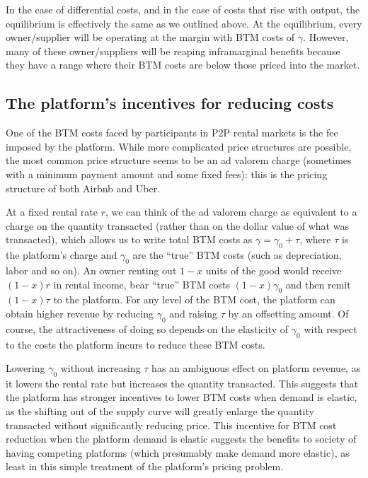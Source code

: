 \documentclass[11pt]{article}
\begin{document}
In the case of differential costs, and in the case of costs that rise with output, the equilibrium is effectively the same as we outlined above.
At the equilibrium, every owner/supplier will be operating at the margin with BTM costs of $\gamma$.
However, many of these owner/suppliers will be reaping inframarginal benefits because they have a range where their BTM costs are below those priced into the market. 

\subsection{The platform's incentives for reducing costs}
One of the BTM costs faced by participants in P2P rental markets is the fee imposed by the platform.
While more complicated price structures are possible, the most common price structure seems to be an ad valorem charge (sometimes with a minimum payment amount and some fixed fees):
this is the pricing structure of both Airbnb and Uber.

At a fixed rental rate $r$, we can think of the ad valorem charge as equivalent to a charge on the quantity transacted (rather than on the dollar value of what was transacted), which allows us to write total BTM costs as $\gamma = \gamma_0 + \tau$, where $\tau$ is the platform's charge and $\gamma_0$ are the ``true'' BTM costs (such as depreciation, labor and so on). 
An owner renting out $1 - x$ units of the good would receive $(1 - x)r$ in rental income, bear ``true'' BTM costs $(1 - x)\gamma_0$ and then remit $(1-x)\tau$ to the platform. 
For any level of the BTM cost, the platform can obtain higher revenue by reducing $\gamma_0$ and raising $\tau$ by an offsetting amount.
Of course, the attractiveness of doing so depends on the elasticity of $\gamma_0$ with respect to the costs the platform incurs to reduce these BTM costs. 

Lowering $\gamma_0$ without increasing $\tau$ has an ambiguous effect on platform revenue, as it lowers the rental rate but increases the quantity transacted.
This suggests that the platform has stronger incentives to lower BTM costs when demand is elastic, as the shifting out of the supply curve will greatly enlarge the quantity transacted without significantly reducing price.
This incentive for BTM cost reduction when the platform demand is elastic suggests the benefits to society of having competing platforms (which presumably make demand more elastic), as least in this simple treatment of the platform's pricing problem. 
\end{document}
